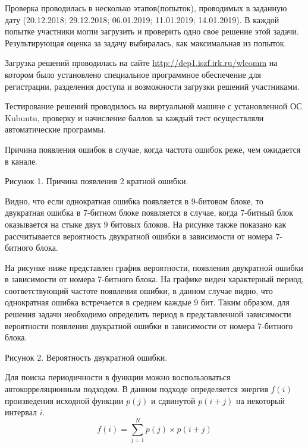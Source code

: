 Проверка проводилась в несколько этапов(попыток), проводимых в заданную дату (20.12.2018; 29.12.2018; 06.01.2019; 11.01.2019; 14.01.2019). В каждой попытке участники могли загрузить и проверить одно свое решение этой задачи.
Результирующая оценка за задачу выбиралась, как максимальная из попыток.

Загрузка решений проводилась на сайте \url{http://dep1.iszf.irk.ru/wlcomm} на котором было установлено специальное программное обеспечение для регистрации, разделения доступа и возможности загрузки решений участниками.

Тестирование решений проводилось на виртуальной машине с установленной ОС Kubuntu, проверку и начисление баллов за каждый тест осуществляли автоматические программы.

\explanationSection

Причина появления ошибок в случае, когда частота ошибок реже, чем ожидается в канале. 


\begin{center}
    Рисунок 1. Причина появления 2 кратной ошибки.
\end{center}

Видно, что если однократная ошибка появляется в 9-битовом блоке, то двукратная ошибка в 7-битном блоке появляется в случае, когда 7-битный блок оказывается на стыке двух 9 битовых блоков. На рисунке также показано как рассчитывается вероятность двукратной ошибки в зависимости от номера 7-битного блока.

На рисунке ниже представлен график вероятности, появления двукратной ошибки в зависимости от номера 7-битного блока. На графике виден характерный период, соответствующий частоте появления ошибки, в данном случае видно, что однократная ошибка встречается в среднем каждые 9 бит. Таким образом, для решения задачи необходимо определить период в представленной зависимости вероятности появления двукратной ошибки в зависимости от номера 7-битного блока.


\begin{center}
    Рисунок 2. Вероятность двукратной ошибки.
\end{center}

Для поиска периодичности в функции можно воспользоваться автокорреляционным подходом. В данном подходе определяется энергия $f(i)$  произведения исходной функции $p(j)$ и сдвинутой $p(i+j)$ на некоторый интервал $i$.
$$f(i)=\sum_{j=1}^N p(j) \times p(i+j)$$

